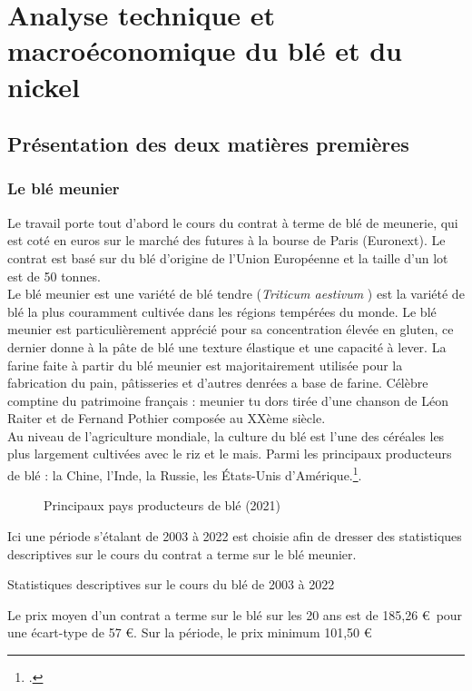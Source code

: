 \section{Analyse technique et macroéconomique du blé et du nickel}
\subsection{Présentation des deux matières premières}
\subsubsection{Le blé meunier}
Le travail porte tout d'abord le cours du contrat à terme de blé de meunerie, qui est coté en euros sur le marché des futures à la bourse de Paris (Euronext). 
Le contrat est basé sur du blé d'origine de l'Union Européenne et la taille d'un lot est de 50 tonnes. \\[11pt]
Le blé meunier est une variété de blé tendre (\textit{Triticum aestivum} ) est la variété de blé la plus couramment cultivée dans les régions tempérées 
du monde. Le blé meunier est particulièrement apprécié pour sa concentration élevée en gluten, ce dernier donne à la pâte de blé une texture élastique et une capacité à 
lever. La farine faite à partir du blé meunier est majoritairement utilisée pour la fabrication du pain, pâtisseries et d'autres denrées a base de farine. Célèbre comptine 
du patrimoine français : meunier tu dors tirée d'une chanson de Léon Raiter et de Fernand Pothier composée au XXème siècle.\\[11pt]
Au niveau de l'agriculture mondiale, la culture du blé est l'une des céréales les plus largement cultivées avec le riz et le mais. Parmi les principaux
producteurs de blé : la Chine, l'Inde, la Russie, les États-Unis d'Amérique.\footcite{fao_2021}.
\begin{figure}[H]
    \centering
    \label{fig:ble_prod}
    \resizebox{0.8\textwidth}{!}{}
    \caption{Principaux pays producteurs de blé (2021)}
\end{figure}
Ici une période s'étalant de 2003 à 2022 est choisie afin de dresser des statistiques descriptives sur le cours du contrat a terme sur le blé meunier. 
\begin{table}[H]
    \centering
    \caption{Statistiques descriptives sur le cours du blé de 2003 à 2022}
    \sffamily
    
\end{table}
Le prix moyen d'un contrat a terme sur le blé sur les 20 ans est de 185,26 \euro\ pour une écart-type de 57 \euro. Sur la période, le prix minimum 101,50 \euro\ 
